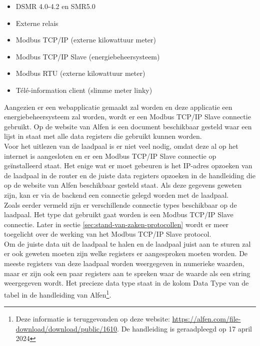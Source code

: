 \begin{itemize}
    \item DSMR 4.0-4.2 en SMR5.0
    \item Externe relais
    \item Modbus TCP/IP (externe kilowattuur meter)
    \item Modbus TCP/IP Slave (energiebeheersysteem)
    \item Modbus RTU (externe kilowattuur meter)
    \item Télé-information client (slimme meter linky)
\end{itemize}

Aangezien er een webapplicatie gemaakt zal worden en deze applicatie een energiebeheersysteem zal worden, wordt er een Modbus TCP/IP Slave connectie gebruikt. Op de website van Alfen is een document beschikbaar gesteld waar een lijst in staat met alle data registers die gebruikt kunnen worden.\\

Voor het uitlezen van de laadpaal is er niet veel nodig, omdat deze al op het internet is aangesloten en er een Modbus TCP/IP Slave connectie op geïnstalleerd staat. Het enige wat er moet gebeuren is het IP-adres opzoeken van de laadpaal in de router en de juiste data registers opzoeken in de handleiding die op de website van Alfen beschikbaar gesteld staat. Als deze gegevens geweten zijn, kan er via de backend een connectie gelegd worden met de laadpaal.\\

Zoals eerder vermeld zijn er verschillende connectie types beschikbaar op de laadpaal. Het type dat gebruikt gaat worden is een Modbus TCP/IP Slave connectie. Later in sectie \ref{sec:stand-van-zaken-protocollen} wordt er meer toegelicht over de werking van het Modbus TCP/IP Slave protocol.\\

Om de juiste data uit de laadpaal te halen en de laadpaal juist aan te sturen zal er ook geweten moeten zijn welke registers er aangesproken moeten worden. De meeste registers van deze laadpaal worden weergegeven in numerieke waarden, maar er zijn ook een paar registers aan te spreken waar de waarde als een string weergegeven wordt. Het precieze data type staat in de kolom Data Type van de tabel in de handleiding van Alfen\footnote{Deze informatie is teruggevonden op deze website: \url{https://alfen.com/file-download/download/public/1610}. De handleiding is geraadpleegd op 17 april 2024}.\\

